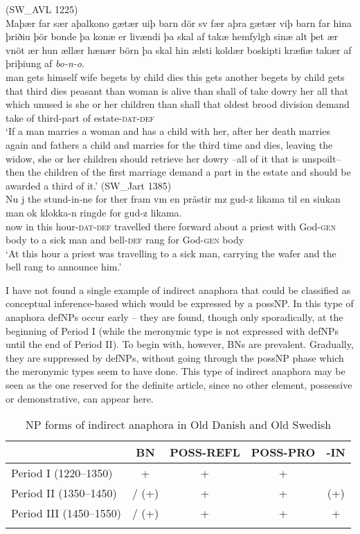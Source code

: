 \documentclass[output=paper]{langsci/langscibook}
\begin{document}
\begin{exe}
\ex\label{6ex:33}
(SW\_AVL 1225)\\
\gll Maþær far sær aþalkono gætær uiþ barn dör sv fær aþra gætær viþ barn far hina þriðiu þör bonde þa konæ er livændi þa skal af takæ hemfylgh sinæ alt þet ær vnöt ær hun ællær hænær börn þa skal hin ælsti koldær boskipti kræfiæ takær af þriþiung af {\emph{bo-n-o}}. \\
man gets himself wife begets by child dies this gets another begets by child gets that third dies peasant than woman is alive than shall of take dowry her all that which unused is she or her children than shall that oldest brood division demand take of third-part of estate-{\textsc{dat-def}} \\
\glt `If a man marries a woman and has a child with her, after her death marries again and fathers a child and marries for the third time and dies, leaving the widow, she or her children should retrieve her dowry --all of it that is unspoilt-- then the children of the first marriage demand a part in the estate and should be awarded a third of it.'
\ex\label{6ex:34}
(SW\_Jart 1385)\\
\gll Nu j the stund-in-ne for ther fram vm en prästir mz gud-z likama til en siukan man ok klokka-n ringde for gud-z likama. \\
now in this hour-{\textsc{dat-def}} travelled there forward about a priest with God-{\textsc{gen}} body to a sick man and bell-{\textsc{def}} rang for God-{\textsc{gen}} body \\
\glt `At this hour a priest was travelling to a sick man, carrying the wafer and the bell rang to announce him.'
\end{exe}

I have not found a single example of indirect anaphora that could be classified as conceptual inference-based which would be expressed by a possNP. In this type of anaphora defNPs occur early -- they are found, though only sporadically, at the beginning of Period I (while the meronymic type is not expressed with defNPs until the end of Period II). To begin with, however, BNs are prevalent. Gradually, they are suppressed by defNPs, without going through the possNP phase which the meronymic types seem to have done. This type of indirect anaphora may be seen as the one reserved for the definite article, since no other element, possessive or demonstrative, can appear here. 

\begin{table}
\begin{tabularx}{\textwidth}{Xcccc}
\lsptoprule
					& {\textbf{BN}}	& {\textbf{POSS-REFL}}	& {\textbf{POSS-PRO}}	& {\textbf{-IN}} \\
\midrule
Period I (1220–1350)	& +			& +				& +				& \minus \\ 
Period II (1350–1450)	& \minus / (+)	& +				& +				& (+) \\ 
Period III (1450–1550)	& \minus / (+)	& +				& +				& + \\ 
\lspbottomrule
\end{tabularx}
\caption{NP forms of indirect anaphora in Old Danish and Old Swedish}\label{6table:4}
\end{table}
\end{document}
